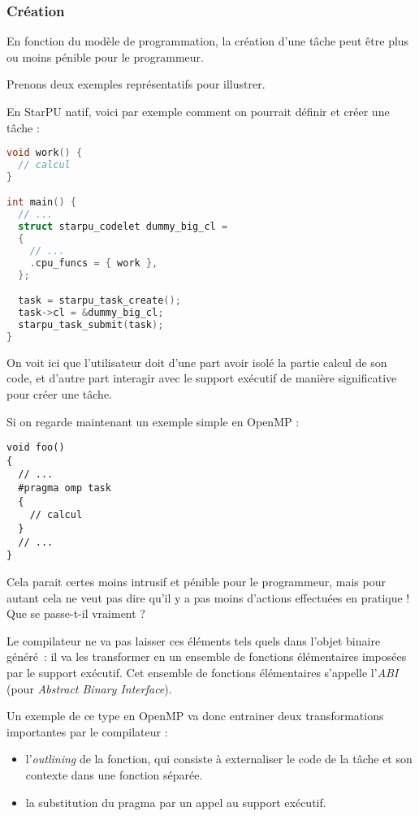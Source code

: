 \subsubsection{Création}

En fonction du modèle de programmation, la création d'une tâche peut être plus ou moins pénible pour le programmeur.

Prenons deux exemples représentatifs pour illustrer.

En StarPU natif, voici par exemple comment on pourrait définir et créer une tâche :

\begin{lstlisting}[language=c++,caption=Exemple simple en StarPU,label=lst:context:simple-starpu,basicstyle=\small]
void work() {
  // calcul
}

int main() {
  // ...
  struct starpu_codelet dummy_big_cl =
  {
    // ...
    .cpu_funcs = { work },
  };

  task = starpu_task_create();
  task->cl = &dummy_big_cl;
  starpu_task_submit(task);
}
\end{lstlisting}

On voit ici que l'utilisateur doit d'une part avoir isolé la partie calcul de son code, et d'autre part interagir avec le support exécutif de manière significative pour créer une tâche.

Si on regarde maintenant un exemple simple en OpenMP :

\begin{lstlisting}
void foo()
{
  // ...
  #pragma omp task
  {
    // calcul
  }
  // ...
}
\end{lstlisting}

Cela parait certes moins intrusif et pénible pour le programmeur, mais pour autant cela ne veut pas dire qu'il y a pas moins d'actions effectuées en pratique !
Que se passe-t-il vraiment ?

Le compilateur ne va pas laisser ces éléments tels quels dans l'objet binaire généré~: il va les transformer en un ensemble de fonctions élémentaires imposées par le support exécutif. Cet ensemble de fonctions élémentaires s'appelle l'\emph{ABI} (pour \emph{Abstract Binary Interface}).

Un exemple de ce type en OpenMP va donc entrainer deux transformations importantes par le compilateur :
\begin{itemize}
  \item l'\emph{outlining} de la fonction, qui consiste à externaliser le code de la tâche et son contexte dans une fonction séparée.
  \item la substitution du pragma par un appel au support exécutif.
\end{itemize}

